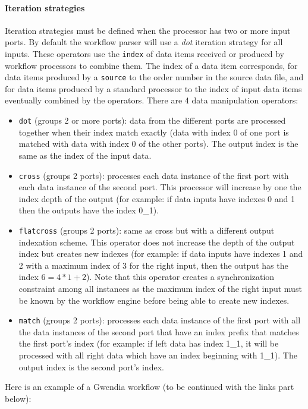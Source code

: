\paragraph{Iteration strategies} Iteration strategies must be defined when the processor has two or more input ports. By default the workflow parser will use a \textit{dot} iteration strategy for all inputs. These operators use the \texttt{index} of data items received or produced by workflow processors to combine them. The index of a data item corresponds, for data items produced by a \texttt{source} to the order number in the source data file, and for data items produced by a standard processor to the index of input data items eventually combined by the operators.
There are 4 data manipulation operators:
\begin{itemize}
\item \texttt{dot} (groups 2 or more ports): data from the different ports are processed together when their index match exactly (data with index 0 of one port is matched with data with index 0 of the other ports). The output index is the same as the index of the input data.
\item \texttt{cross} (groups 2 ports): processes each data instance of the first port with each data instance of the second port. This processor will increase by one the index depth of the output (for example: if data inputs have indexes 0 and 1 then the outputs have the index 0\_1).
\item \texttt{flatcross} (groups 2 ports): same as cross but with a different output indexation scheme. This operator does not increase the depth of the output index but creates new indexes (for example: if data inputs have indexes 1 and 2 with a maximum index of 3 for the right input, then the output has the index $6 = 4*1 + 2$). Note that this operator creates a synchronization constraint among all instances as the maximum index of the right input must be known by the workflow engine before being able to create new indexes.
\item \texttt{match} (groups 2 ports): processes each data instance of the first port with all the data instances of the second port that have an index prefix that matches the first port's index (for example: if left data has index 1\_1, it will be processed with all right data which have an index beginning with 1\_1). The output index is the second port's index.
\end{itemize}

Here is an example of a Gwendia workflow (to be continued with the links part below):

